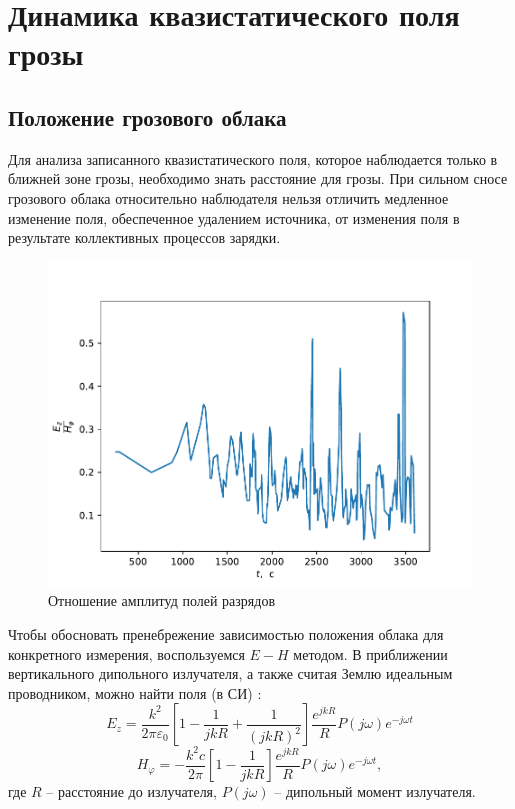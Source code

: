 \documentclass[a4paper,14pt]{extarticle}
\begin{document}
\newpage
\section{Динамика квазистатического поля грозы}
\subsection{Положение грозового облака}

Для анализа записанного квазистатического поля, которое наблюдается только в ближней зоне грозы, необходимо знать расстояние для грозы. При сильном сносе
грозового облака относительно наблюдателя нельзя отличить медленное изменение поля, обеспеченное удалением источника, от изменения поля в результате коллективных процессов зарядки.

\begin{figure}[H]
  \centering
  \includegraphics[scale=1]{fig/frac.pdf}
  \caption{Отношение амплитуд полей разрядов}
  \label{fig:frac}
\end{figure}

Чтобы обосновать пренебрежение зависимостью положения облака для конкретного измерения, воспользуемся $E-H$ методом. В приближении вертикального дипольного излучателя, а также считая Землю идеальным проводником, можно найти поля (в СИ) \cite{rp}:
\begin{equation}
  E_z = \frac{k^{2}}{2 \pi \varepsilon_{0}}\left[1-\frac{1}{j k R}+\frac{1}{(j k R)^{2}}\right] \frac{e^{j k R}}{R} P(j \omega) e^{-j \omega t}
\end{equation}
\begin{equation}
  H_{\varphi}=-\frac{k^{2} c}{2 \pi}\left[1-\frac{1}{j k R}\right] \frac{e^{j k R}}{R} P(j \omega) e^{-j \omega t},
\end{equation}
где $R$ -- расстояние до излучателя, $P(j\omega)$ -- дипольный момент излучателя.
\end{document}
